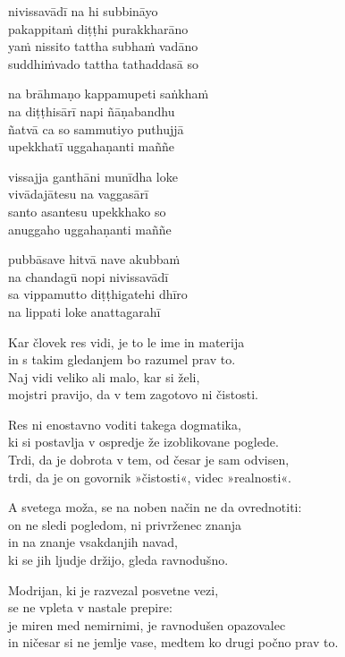 nivissavādī na hi subbināyo\\
pakappitaṁ diṭṭhi purakkharāno\\
yaṁ nissito tattha subhaṁ vadāno\\
suddhiṁvado tattha tathaddasā so

na brāhmaṇo kappamupeti saṅkhaṁ\\
na diṭṭhisārī napi ñāṇabandhu\\
ñatvā ca so sammutiyo puthujjā\\
upekkhatī uggahaṇanti maññe

vissajja ganthāni munīdha loke\\
vivādajātesu na vaggasārī\\
santo asantesu upekkhako so\\
anuggaho uggahaṇanti maññe

pubbāsave hitvā nave akubbaṁ\\
na chandagū nopi nivissavādī\\
sa vippamutto diṭṭhigatehi dhīro\\
na lippati loke anattagarahī


\clearpage

Kar človek res vidi, je to le ime in materija\\
in s takim gledanjem bo razumel prav to.\\
Naj vidi veliko ali malo, kar si želi,\\
mojstri pravijo, da v tem zagotovo ni čistosti.

Res ni enostavno voditi takega dogmatika,\\
ki si postavlja v ospredje že izoblikovane poglede.\\
Trdi, da je dobrota v tem, od česar je sam odvisen,\\
trdi, da je on govornik »čistosti«, videc »realnosti«.

A svetega moža, se na noben način ne da ovrednotiti:\\
on ne sledi pogledom, ni privrženec znanja\\
in na znanje vsakdanjih navad,\\
ki se jih ljudje držijo, gleda ravnodušno.

Modrijan, ki je razvezal posvetne vezi,\\
se ne vpleta v nastale prepire:\\
je miren med nemirnimi, je ravnodušen opazovalec\\
in ničesar si ne jemlje vase, medtem ko drugi počno prav to.

